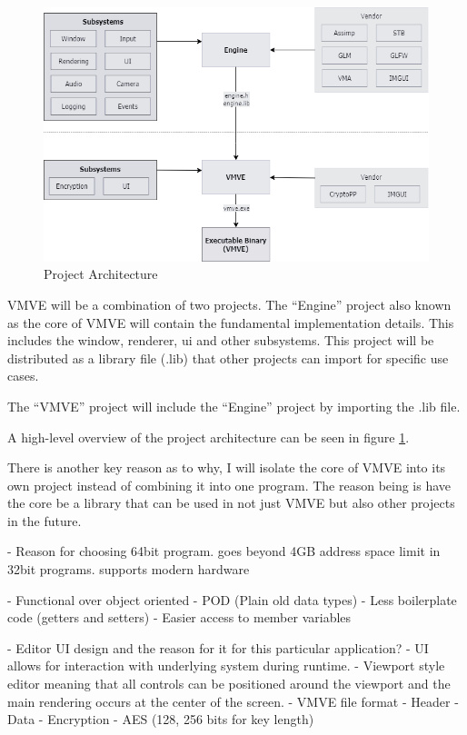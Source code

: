 \documentclass[11pt]{article}
\begin{document}
\begin{figure}[h!]
  \centering
  \includegraphics[width=\textwidth]{images/project_architecture.png}
  \caption{Project Architecture}
  \label{fig:projarch}
\end{figure}
VMVE will be a combination of two projects. The ``Engine'' project
also known as the core of VMVE will contain the fundamental
implementation details. This includes the window, renderer, ui and
other subsystems. This project will be distributed as a library
file (.lib) that other projects can import for specific use cases.

The ``VMVE'' project will include the ``Engine'' project by importing
the .lib file.

A high-level overview of the project architecture can be seen in
figure \ref{fig:projarch}.

There is another key reason as to why, I will isolate the core of VMVE
into its own project instead of combining it into one program. The
reason being is have the core be a library that can be used in not
just VMVE but also other projects in the future.








- Reason for choosing 64bit program.
    goes beyond 4GB address space limit in 32bit programs.
    supports modern hardware

- Functional over object oriented
-   POD (Plain old data types)
-   Less boilerplate code (getters and setters)
-   Easier access to member variables

- Editor UI design and the reason for it for this particular application?
-   UI allows for interaction with underlying system during runtime.
-   Viewport style editor meaning that all controls can be positioned
    around the viewport and the main rendering occurs at the center of
    the screen.
- VMVE file format
-    Header
-    Data
- Encryption
- AES (128, 256 bits for key length)
\end{document}
